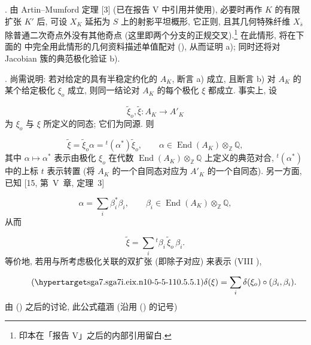\smallskip
\noindent
{}. 由 Artin--Mumford 定理 [3] (已在报告 V 中引用并使用), 必要时再作 $K$ 的有限扩张 $K'$ 后, 可设 $X_K$ 延拓为 $S$ 上的射影平坦概形, 它正则, 且其几何特殊纤维 $X_{\bar s}$ 除普通二次奇点外没有其他奇点 (这里即两个分支的正规交叉).\footnote{印本在「报告 V」之后的内部引用留白.} 在此情形, 将在下面的  中完全用此情形的几何资料描述单值配对 (), 从而证明  a); 同时还将对 Jacobian 簇的典范极化验证  b).

\smallskip
\noindent
{}. 尚需说明: 若对给定的具有半稳定约化的 $A_K$, 断言  a) 成立, 且断言  b) 对 $A_K$ 的某个给定极化 $\xi_o$ 成立, 则同一结论对 $A_K$ 的每个极化 $\xi$ 都成立. 事实上, 设

\begin{equation*}
\widetilde\xi_o,\widetilde\xi:A_K\longrightarrow A'_K
\end{equation*}
为 $\xi_o$ 与 $\xi$ 所定义的同态; 它们为同源. 则

\begin{equation*}
\widetilde\xi=\widetilde\xi_o\alpha
 ={}^t(\alpha^*)\widetilde\xi_o,
 \qquad
\alpha\in\operatorname{End}(A_K)\otimes_{\mathbb Z}\mathbb Q,
\end{equation*}
其中 $\alpha\longmapsto\alpha^*$ 表示由极化 $\xi_o$ 在代数 $\operatorname{End}(A_K)\otimes_{\mathbb Z}\mathbb Q$ 上定义的典范对合, ${}^t(\alpha^*)$ 中的上标 $t$ 表示转置 (将 $A_K$ 的一个自同态对应为 $A'_K$ 的一个自同态). 另一方面, 已知 [15, 第~V~章, 定理~3]

\begin{equation*}
\alpha=\sum_i\beta_i^*\beta_i,
 \qquad
\beta_i\in\operatorname{End}(A_K)\otimes_{\mathbb Z}\mathbb Q,
\end{equation*}
从而

\begin{equation*}
\widetilde\xi=\sum_i{}^t\beta_i\,\widetilde\xi_o\,\beta_i.
\end{equation*}
等价地, 若用与所考虑极化关联的双扩张 (即除子对应) 来表示 (VIII ),

\begin{equation}\tag{\SGARefTarget{sga7.sga7i.eix.n10-5-5-1}{10.5.5.1}}
\delta(\xi)=\sum_i\delta(\xi_o)\circ(\beta_i,\beta_i).
\end{equation}
由 () 之后的讨论, 此公式蕴涵 (沿用 () 的记号)

